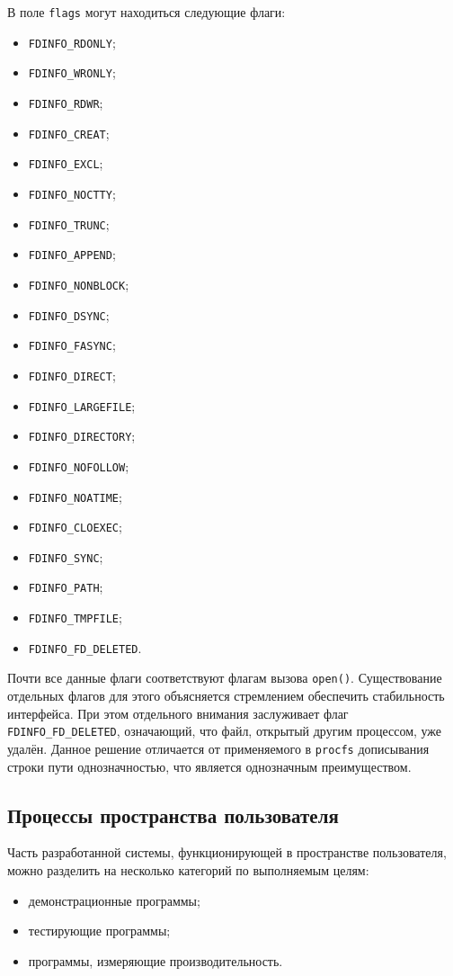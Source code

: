 В поле \texttt{flags} могут находиться следующие флаги:
\begin{itemize}
\item \texttt{FDINFO\_RDONLY};
\item \texttt{FDINFO\_WRONLY};
\item \texttt{FDINFO\_RDWR};
\item \texttt{FDINFO\_CREAT}; 
\item \texttt{FDINFO\_EXCL};
\item \texttt{FDINFO\_NOCTTY};
\item \texttt{FDINFO\_TRUNC};
\item \texttt{FDINFO\_APPEND};
\item \texttt{FDINFO\_NONBLOCK};
\item \texttt{FDINFO\_DSYNC};
\item \texttt{FDINFO\_FASYNC};
\item \texttt{FDINFO\_DIRECT};
\item \texttt{FDINFO\_LARGEFILE};
\item \texttt{FDINFO\_DIRECTORY};
\item \texttt{FDINFO\_NOFOLLOW};
\item \texttt{FDINFO\_NOATIME};
\item \texttt{FDINFO\_CLOEXEC};
\item \texttt{FDINFO\_SYNC};
\item \texttt{FDINFO\_PATH};
\item \texttt{FDINFO\_TMPFILE};
\item \texttt{FDINFO\_FD\_DELETED}.
\end{itemize}

Почти все данные флаги соответствуют флагам вызова \texttt{open()}.
Существование отдельных флагов для этого объясняется стремлением обеспечить
стабильность интерфейса. При этом отдельного внимания заслуживает флаг
\texttt{FDINFO\_FD\_DELETED}, означающий, что файл, открытый другим процессом,
уже удалён. Данное решение отличается от применяемого в \texttt{procfs}
дописывания строки пути однозначностью, что является однозначным преимуществом.

\subsection{Процессы пространства пользователя}

Часть разработанной системы, функционирующей в пространстве пользователя, можно
разделить на несколько категорий по выполняемым целям:
\begin{itemize}
\item демонстрационные программы;
\item тестирующие программы;
\item программы, измеряющие производительность.
\end{itemize}

